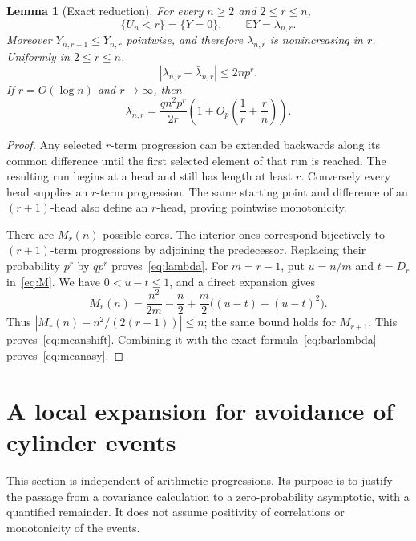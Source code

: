 \documentclass[11pt]{article}
\newtheorem{lemma}[theorem]{Lemma}
\theoremstyle{definition}\newtheorem{definition}[theorem]{Definition}
\theoremstyle{remark}\newtheorem{remark}[theorem]{Remark}
\newcommand{\EE}{\mathbb E}
\newcommand{\la}{\lambda}
\begin{document}
\begin{lemma}[Exact reduction]\label{lem:mean}
For every $n\ge2$ and $2\le r\le n$,
\[
 \{U_n<r\}=\{Y=0\},\qquad \EE Y=\la_{n,r}.
\]
Moreover $Y_{n,r+1}\le Y_{n,r}$ pointwise, and therefore $\la_{n,r}$
is nonincreasing in $r$. Uniformly in $2\le r\le n$,
\begin{equation}
 |\la_{n,r}-\bar\la_{n,r}|\le 2np^r.\label{eq:meanshift}
\end{equation}
If $r=O(\log n)$ and $r\to\infty$, then
\begin{equation}
 \la_{n,r}=\frac{qn^2p^r}{2r}
          \left(1+O_p\left(\frac1r+\frac rn\right)\right).
 \label{eq:meanasy}
\end{equation}
\end{lemma}
\begin{proof}
Any selected $r$-term progression can be extended backwards along its
common difference until the first selected element of that run is reached.
The resulting run begins at a head and still has length at least $r$.
Conversely every head supplies an $r$-term progression.
The same starting point and difference of an $(r+1)$-head also define an
$r$-head, proving pointwise monotonicity.

There are $M_r(n)$ possible cores. The interior ones correspond bijectively
to $(r+1)$-term progressions by adjoining the predecessor. Replacing their
probability $p^r$ by $qp^r$ proves~\eqref{eq:lambda}.
For $m=r-1$, put $u=n/m$ and $t=D_r$ in~\eqref{eq:M}. We have
$0<u-t\le1$, and a direct expansion gives
\[
 M_r(n)=\frac{n^2}{2m}-\frac n2
       +\frac m2\bigl((u-t)-(u-t)^2\bigr).
\]
Thus $|M_r(n)-n^2/(2(r-1))|\le n$; the same bound holds for
$M_{r+1}$. This proves~\eqref{eq:meanshift}. Combining it with the exact
formula~\eqref{eq:barlambda} proves~\eqref{eq:meanasy}.
\end{proof}

\section{A local expansion for avoidance of cylinder events}\label{sec:avoidance}
This section is independent of arithmetic progressions. Its purpose is to
justify the passage from a covariance calculation to a zero-probability
asymptotic, with a quantified remainder. It does not assume positivity
of correlations or monotonicity of the events.
\end{document}
